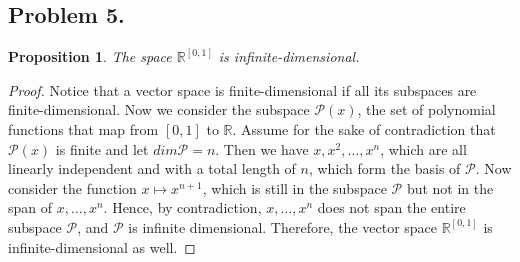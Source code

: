 \documentclass{article}
\newtheorem{proposition}[thm]{Proposition}
\begin{document}
\subsection*{Problem 5.}
\begin{proposition}
    The space $\mathbb{R}^{[0,1]}$ is infinite-dimensional.
\end{proposition}
\begin{proof}
    Notice that a vector space is finite-dimensional if all its subspaces are finite-dimensional. 
    Now we consider the subspace $\mathcal{P}(x)$, the set of polynomial functions that map from 
    $[0,1]$ to $\mathbb{R}$. Assume for the sake of contradiction that $\mathcal{P}(x)$ is finite 
    and let $dim\mathcal{P} = n$. Then we have $x, x^2, \dots, x^n$, which are all linearly 
    independent and with a total length of $n$, which form the basis of $\mathcal{P}$. Now consider 
    the function $x\mapsto x^{n+1}$, which is still in the subspace $\mathcal{P}$ but not in the 
    span of $x, \dots, x^n$. Hence, by contradiction, $x, \dots, x^n$ does not span the entire 
    subspace $\mathcal{P}$, and $\mathcal{P}$ is infinite dimensional. Therefore, the 
    vector space $\mathbb{R}^{[0,1]}$ is infinite-dimensional as well.
\end{proof}
\end{document}
